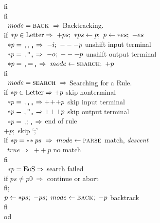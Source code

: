 \begin{tabbing}
\>\>	    f{}i							\\
\>	f{}i								\\
  \orbox\ $mode=\mbox{\sc {back}}\ \Rightarrow$ \>\>\>\>\>\>
						\bq Backtracking.	\\
\>	if $*p\in{\rm Letter}\Rightarrow\ +ps;\ *ps\leftarrow p;\ p\leftarrow*es;\ -es$	\\
\>	\orbox\ $*p=\sq\sq\sq \Rightarrow\ -i;\ ---p$
					\>\>\>\>\>\>\bq unshift input terminal\\
\>	\orbox\ $*p=\sq\qt\sq \Rightarrow\ -o;\ ---p$
					\>\>\>\>\>\>\bq unshift output terminal\\
\>	\orbox\ $*p=\sq\!=\!\sq \Rightarrow\ mode\leftarrow\tname{search};\ +p$	\\
\>	f{}i								\\
  \orbox\ $mode=\mbox{\sc {search}}\ \Rightarrow$ \>\>\>\>\>\>
						\bq Searching for a Rule.\\
\>	if $*p\in {\rm Letter} \Rightarrow +p$ \>\>\>\>	
						\>\bq skip nonterminal\\
\>	\orbox\ $*p=\sq\sq\sq \Rightarrow +\!+\!+p$ \>\>\>\>
						\>\bq skip input terminal\\
\>	\orbox\ $*p=\sq\qt\sq \Rightarrow +\!+\!+p$ \>\>\>\>
						\>\bq skip output terminal\\
\>	\orbox\ $*p=\sq;\sq \Rightarrow$ \>\>\>\>	\>\bq end of rule\\
\>\>	    $+p;$			   \>\>\>	\>\>\bq skip `;'\\
\>\>	    if $*p=*\!*ps\ \Rightarrow\ mode\leftarrow\tname{parse}$
					\>\>\>		
					\>\>\bq match, {\em descent}	\\
\>\>	    \orbox\ $true \Rightarrow$\ $+\!+p$	\>\>\>		\>\>\bq no match\\
\>\>	    f{}i							\\
\>	\orbox\ $*p={\rm EoS} \Rightarrow$ 
					\>\>\>\>	\>\bq search failed \\
\>\>	    if $ps\not=p0\ \Rightarrow$ \>\>\>\> \>\bq continue or abort\\
\>\>	    f{}i;							\\
\>\>	    $p\leftarrow*ps;\ -ps;\ mode\leftarrow\tname{back};\ -p$
					\>\>\>\>\>\bq backtrack		\\
\>	f{}i								\\
od								\\
\end{tabbing}




